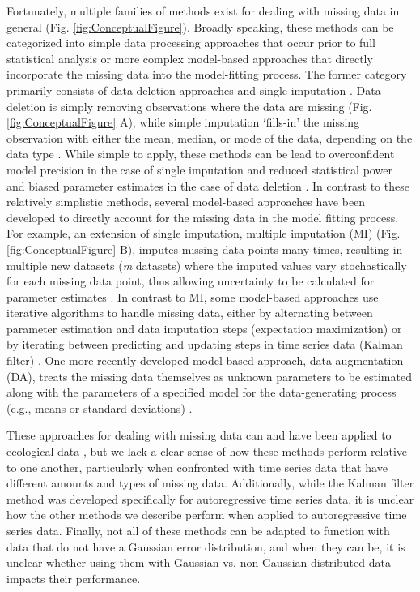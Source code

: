 \documentclass{article}
\begin{document}
\begin{linenumbers}
Fortunately, multiple families of methods exist for dealing with missing data in general (Fig. \ref{fig:ConceptualFigure}). Broadly speaking, these methods can be categorized into simple data processing approaches that occur prior to full statistical analysis or more complex model-based approaches that directly incorporate the missing data into the model-fitting process. The former category primarily consists of data deletion approaches and single imputation \citep{nakagawa_model_2011}. Data deletion is simply removing observations where the data are missing (Fig. \ref{fig:ConceptualFigure} A), while simple imputation `fills-in' the missing observation with either the mean, median, or mode of the data, depending on the data type \citep{kang2013prevention, nakagawa_missing_2015, onkelinx_working_2017}. While simple to apply, these methods can be lead to overconfident model precision in the case of single imputation \citep{fichman2003multiple, nakagawa_model_2011, aleryani2018dealing} and reduced statistical power and biased parameter estimates in the case of data deletion \citep{nakagawa_model_2011, aleryani2018dealing}. In contrast to these relatively simplistic methods, several model-based approaches have been developed to directly account for the missing data in the model fitting process. For example, an extension of single imputation, multiple imputation (MI) (Fig. \ref{fig:ConceptualFigure} B), imputes missing data points many times, resulting in multiple new datasets (\textit{m} datasets) where the imputed values vary stochastically for each missing data point, thus allowing uncertainty to be calculated for parameter estimates \citep{rubin1996multiple, rubin1988overview, nakagawa_model_2011, nakagawa_missing_2015}. In contrast to MI, some model-based approaches use iterative algorithms to handle missing data, either by alternating between parameter estimation and data imputation steps (expectation maximization) \citep{nadjafi2022expectation,li2019expectation, kang2013prevention} or by iterating between predicting and updating steps in time series data (Kalman filter) \citep{kalman_filter_1960}. One more recently developed model-based approach, data augmentation (DA), treats the missing data themselves as unknown parameters to be estimated along with the parameters of a specified model for the data-generating process (e.g., means or standard deviations) \citep{kong_sequential_1994}. 

 These approaches for dealing with missing data can and have been applied to ecological data \citep{Newman2023, Soldaat2007}, but we lack a clear sense of how these methods perform relative to one another, particularly when confronted with time series data that have different amounts and types of missing data. Additionally, while the Kalman filter method was developed specifically for autoregressive time series data, it is unclear how the other methods we describe perform when applied to autoregressive time series data. Finally, not all of these methods can be adapted to function with data that do not have a Gaussian error distribution, and when they can be, it is unclear whether using them with Gaussian vs. non-Gaussian distributed data impacts their performance.



\end{linenumbers}
\end{document}
